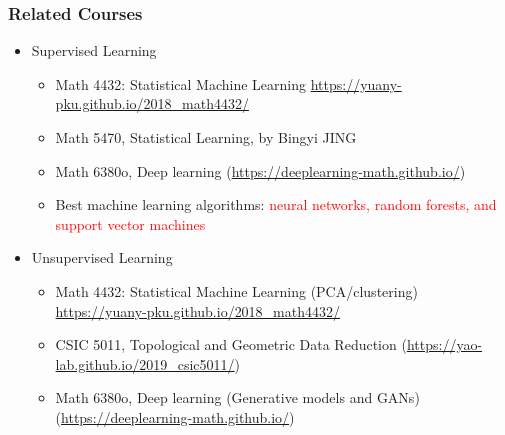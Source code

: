 \documentclass[10pt,a4paper]{beamer}
\begin{document}
   \begin{frame}
   	\frametitle{Related Courses}
   	\begin{itemize}
		\item Supervised Learning 
		\begin{itemize}
		\item Math 4432: Statistical Machine Learning \textcolor{blue}{\url{https://yuany-pku.github.io/2018_math4432/}}
		\item Math 5470, Statistical Learning, by Bingyi JING
		\item Math 6380o, Deep learning (\textcolor{blue}{\url{https://deeplearning-math.github.io/}})
		\item Best machine learning algorithms: \textcolor{red}{neural networks, random forests, and support vector machines}
		\end{itemize}
		\item Unsupervised Learning
		\begin{itemize}
		\item Math 4432: Statistical Machine Learning (PCA/clustering) \textcolor{blue}{\url{https://yuany-pku.github.io/2018_math4432/}}
		\item CSIC 5011, Topological and Geometric Data Reduction (\textcolor{blue}{\url{https://yao-lab.github.io/2019_csic5011/}})
		\item Math 6380o, Deep learning (Generative models and GANs) (\textcolor{blue}{\url{https://deeplearning-math.github.io/}})

		\end{itemize}
   	\end{itemize}
   \end{frame}
   
\end{document}
